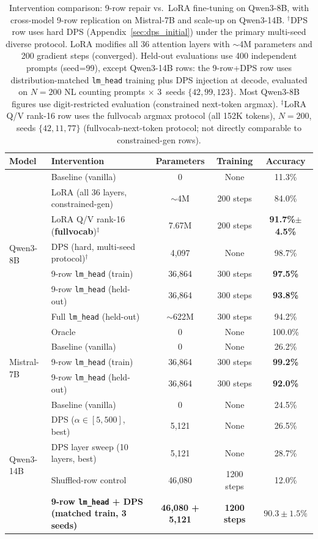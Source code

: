 \documentclass{article}
\begin{document}
\begin{table}[h]
\centering
\caption{Intervention comparison: 9-row repair vs.\ LoRA fine-tuning on Qwen3-8B,
with cross-model 9-row replication on Mistral-7B and scale-up on Qwen3-14B.
$^\dagger$DPS row uses hard DPS (Appendix~\ref{sec:dps_initial}) under the primary multi-seed diverse protocol.
LoRA modifies all 36 attention layers with $\sim$4M parameters and 200 gradient steps (converged).
Held-out evaluations use 400 independent prompts (seed=99), except Qwen3-14B
rows: the 9-row+DPS row uses distribution-matched \texttt{lm\_head} training
plus DPS injection at decode, evaluated on $N{=}200$ NL counting prompts $\times$
3~seeds $\{42, 99, 123\}$.
Most Qwen3-8B figures use digit-restricted evaluation (constrained next-token argmax).
$^{\ddagger}$LoRA Q/V rank-16 row uses the fullvocab argmax protocol (all 152K tokens), $N{=}200$, seeds $\{42, 11, 77\}$ (fullvocab-next-token protocol; not directly comparable to constrained-gen rows).}
\label{tab:intervention_comparison}
\begin{tabular}{llccc}
\toprule
Model & Intervention & Parameters & Training & Accuracy \\
\midrule
\multirow{8}{*}{Qwen3-8B} & Baseline (vanilla) & 0 & None & 11.3\% \\
 & LoRA (all 36 layers, constrained-gen) & $\sim$4M & 200 steps & 84.0\% \\
 & LoRA Q/V rank-16 (\textbf{fullvocab})$^{\ddagger}$ & 7.67M & 200 steps & \textbf{91.7\%$\pm$4.5\%} \\
 & DPS (hard, multi-seed protocol)$^\dagger$ & 4{,}097 & None & 98.7\% \\
 & 9-row \texttt{lm\_head} (train) & 36{,}864 & 300 steps & \textbf{97.5\%} \\
 & 9-row \texttt{lm\_head} (held-out) & 36{,}864 & 300 steps & \textbf{93.8\%} \\
 & Full \texttt{lm\_head} (held-out) & ${\sim}$622M & 300 steps & 94.2\% \\
 & Oracle & 0 & None & 100.0\% \\
\midrule
\multirow{3}{*}{Mistral-7B} & Baseline (vanilla) & 0 & None & 26.2\% \\
 & 9-row \texttt{lm\_head} (train) & 36{,}864 & 300 steps & \textbf{99.2\%} \\
 & 9-row \texttt{lm\_head} (held-out) & 36{,}864 & 300 steps & \textbf{92.0\%} \\
\midrule
\multirow{6}{*}{Qwen3-14B} & Baseline (vanilla) & 0 & None & 24.5\% \\
 & DPS ($\alpha \in [5, 500]$, best) & 5{,}121 & None & 26.5\% \\
 & DPS layer sweep (10 layers, best) & 5{,}121 & None & 28.7\% \\
 & Shuffled-row control & 46{,}080 & 1200 steps & 12.0\% \\
 & \textbf{9-row \texttt{lm\_head} + DPS (matched train, 3 seeds)} & \textbf{46{,}080 + 5{,}121} & \textbf{1200 steps} & \textbf{$90.3 \pm 1.5\%$} \\
\bottomrule
\end{tabular}
\end{table}
\end{document}
